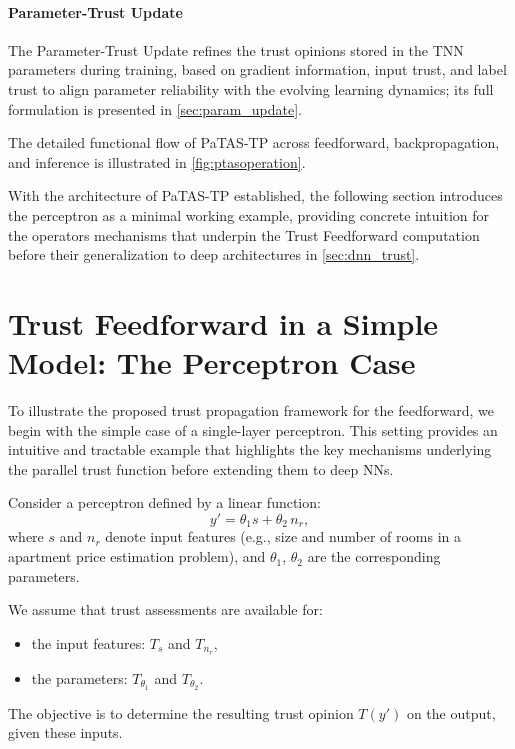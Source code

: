 \paragraph{Parameter-Trust Update}
The Parameter-Trust Update refines the trust opinions stored in the \ac{TNN} parameters during training, based on gradient information, input trust, and label trust to align parameter reliability with the evolving learning dynamics; its full formulation is presented in \cref{sec:param_update}.

The detailed functional flow of \ac{PaTAS-TP} across feedforward, backpropagation, and inference is illustrated in \cref{fig:ptasoperation}. 

With the architecture of \ac{PaTAS-TP} established, the following section introduces the perceptron as a minimal working example, providing concrete intuition for the operators mechanisms that underpin the Trust Feedforward computation before their generalization to deep architectures in \cref{sec:dnn_trust}.

\section{Trust Feedforward in a Simple Model: The Perceptron Case}
\label{sec:perceptron}

To illustrate the proposed trust propagation framework for the feedforward, we begin with the simple case of a single-layer perceptron. This setting provides an intuitive and tractable example that highlights the key mechanisms underlying the parallel trust function before extending them to deep \acp{NN}.

Consider a perceptron defined by a linear function:
\begin{equation}
    y' = \theta_1 s + \theta_2 \, n_r,
    \label{eq:smodel}
\end{equation}
\noindent where $s$ and $n_r$ denote input features (e.g., size and number of rooms in a apartment price estimation problem), and $\theta_1$, $\theta_2$ are the corresponding parameters.

We assume that trust assessments are available for:
\begin{itemize}
    \item the input features: $T_s$ and $T_{n_r}$,
    \item the parameters: $T_{\theta_1}$ and $T_{\theta_2}$.
\end{itemize}
\noindent The objective is to determine the resulting trust opinion $T(y')$ on the output, given these inputs.

